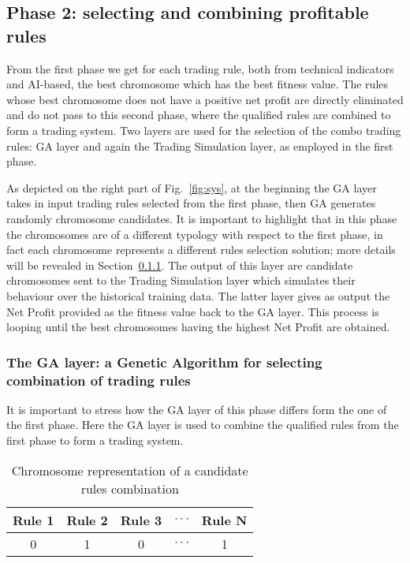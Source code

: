 \subsection{Phase 2: selecting and combining profitable rules}
From the first phase we get for each trading rule, both from technical indicators and AI-based, the best chromosome which has the best fitness value. The rules whose best chromosome does not have a positive net profit are directly eliminated and do not pass to this second phase, where the qualified rules are combined to form a trading system. Two layers are used for the selection of the combo trading rules: GA layer and again the Trading Simulation layer, as employed in the first phase.

As depicted on the right part of Fig.~\ref{fig:sys}, at the beginning the GA layer takes in input trading rules selected from the first phase, then GA generates randomly chromosome candidates. It is important to highlight that in this phase the chromosomes are of a different typology with respect to the first phase, in fact each chromosome represents a different rules selection solution; more details will be revealed in Section~\ref{subsection:ga2}. The output of this layer are candidate chromosomes sent to the Trading Simulation layer which simulates their behaviour over the historical training data. The latter layer gives as output the Net Profit provided as the fitness value back to the GA layer. This process is looping until the best chromosomes having the highest Net Profit are obtained.

\subsubsection{The GA layer: a Genetic Algorithm for selecting combination of trading rules}
\label{subsection:ga2}

It is important to stress how the GA layer of this phase differs form the one of the first phase. Here the GA layer is used to combine the qualified rules from the first phase to form a trading system. 

\begin{center}
\begin{table}[htb]
\centering
\begin{tabular}{|c|c|c|c|c|}
\hline 
Rule 1 & Rule 2 & Rule 3 & $\cdot\cdot\cdot$ & Rule N \\ 
\hline 
0 & 1 & 0 & $\cdot\cdot\cdot$ & 1\\ 
\hline 
\end{tabular} 
\caption{\label{tab:ChromosomeCombo}Chromosome representation of a candidate rules combination}
\end{table}
\end{center}

